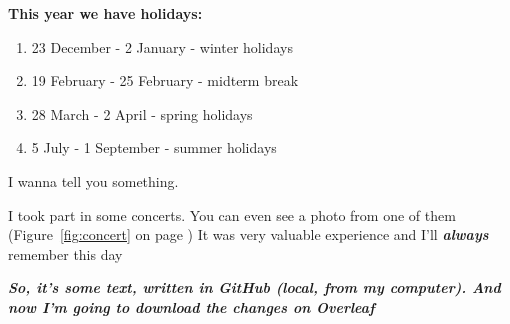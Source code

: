 \textbf{\large This year we have holidays:}
\begin{enumerate}
    \item 23 December - 2 January - winter holidays
    \item 19 February - 25 February - midterm break
    \item 28 March - 2 April - spring holidays
    \item 5 July - 1 September - summer holidays
\end{enumerate}

\begin{center}
    {\large I wanna tell you something.}
    
    I took part in some concerts. You can even see a photo from one of them (Figure~\ref{fig:concert} on page \pageref{fig:concert}) It was very valuable experience and I'll \textbf{\emph{always}} remember this day \par 
    
\end{center}

\emph{\textbf{\large So, it's some text, written in GitHub (local, from my computer). And now I'm going to download the changes on Overleaf}}